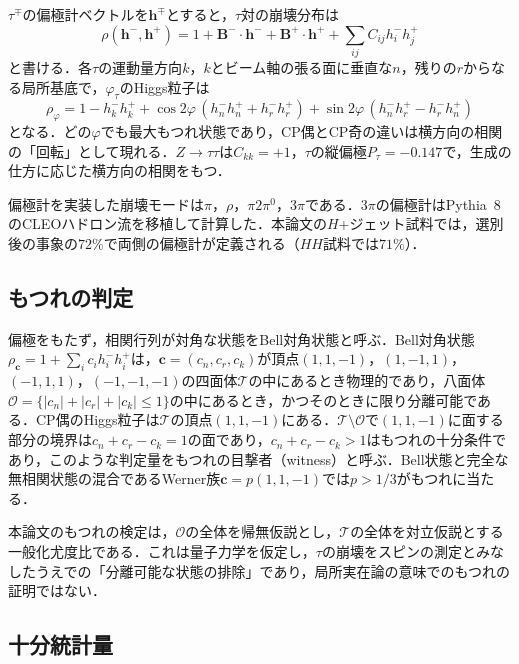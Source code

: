 \documentclass[paper=a4,fontsize=10pt,jafontsize=10pt,line_length=44zw,number_of_lines=46]{jlreq}
\newcommand{\hvec}{\boldsymbol{h}}
\begin{document}
$\tau^\mp$の偏極計ベクトルを$\hvec^\mp$とすると，$\tau$対の崩壊分布は
\begin{equation}
  \rho(\hvec^-,\hvec^+)=1+\boldsymbol B^-\!\cdot\hvec^-+\boldsymbol B^+\!\cdot\hvec^++\sum_{ij}C_{ij}h^-_ih^+_j
\end{equation}
と書ける．各$\tau$の運動量方向$k$，$k$とビーム軸の張る面に垂直な$n$，残りの$r$からなる局所基底で，$\varphi_\tau$のHiggs粒子は
\begin{equation}
  \rho_{\varphi}=1-h^-_kh^+_k+\cos2\varphi\,(h^-_nh^+_n+h^-_rh^+_r)+\sin2\varphi\,(h^-_nh^+_r-h^-_rh^+_n)
  \label{eq:rhophi}
\end{equation}
となる．どの$\varphi$でも最大もつれ状態であり，CP偶とCP奇の違いは横方向の相関の「回転」として現れる．$Z\to\tau\tau$は$C_{kk}=+1$，$\tau$の縦偏極$P_\tau=-0.147$で，生成の仕方に応じた横方向の相関をもつ．

偏極計を実装した崩壊モードは$\pi$，$\rho$，$\pi2\pi^0$，$3\pi$である．$3\pi$の偏極計はPythia~8のCLEOハドロン流\cite{Bierlich:2022pfr}を移植して計算した．本論文の$H$+ジェット試料では，選別後の事象の$72\%$で両側の偏極計が定義される（$HH$試料では$71\%$\cite{dihiggs:paper}）．

\subsection{もつれの判定}

偏極をもたず，相関行列が対角な状態をBell対角状態と呼ぶ．Bell対角状態$\rho_{\boldsymbol c}=1+\sum_ic_ih^-_ih^+_i$は，$\boldsymbol c=(c_n,c_r,c_k)$が頂点$(1,1,-1)$，$(1,-1,1)$，$(-1,1,1)$，$(-1,-1,-1)$の四面体$\mathcal T$の中にあるとき物理的であり，八面体$\mathcal O=\{|c_n|+|c_r|+|c_k|\le1\}$の中にあるとき，かつそのときに限り分離可能である\cite{Horodecki:1996,Peres:1996dw}．CP偶のHiggs粒子は$\mathcal T$の頂点$(1,1,-1)$にある．$\mathcal T\setminus\mathcal O$で$(1,1,-1)$に面する部分の境界は$c_n+c_r-c_k=1$の面であり，$c_n+c_r-c_k>1$はもつれの十分条件であり，このような判定量をもつれの目撃者（witness）と呼ぶ．Bell状態と完全な無相関状態の混合であるWerner族$\boldsymbol c=p(1,1,-1)$では$p>1/3$がもつれに当たる\cite{Werner:1989zz}．

本論文のもつれの検定は，$\mathcal O$の全体を帰無仮説とし，$\mathcal T$の全体を対立仮説とする一般化尤度比である．これは量子力学を仮定し，$\tau$の崩壊をスピンの測定とみなしたうえでの「分離可能な状態の排除」であり，局所実在論の意味でのもつれの証明ではない\cite{Abel:2025,Bechtle:2025}．

\subsection{十分統計量}
\end{document}
